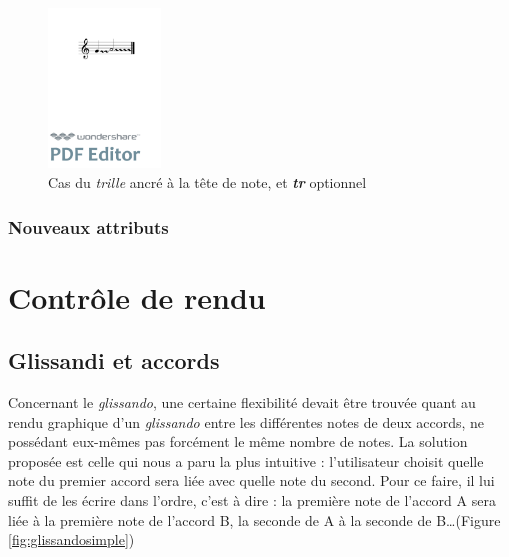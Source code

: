 \documentclass{article}
\newenvironment{gmncode}	{\vspace{-2mm}\small\verbatim}{\endverbatim\vspace{-2mm}}
\begin{document}
\begin{figure}[h]
\centering
\begin{gmncode}
[ \trill<tr="false", anchor="note">
( {g} {a/2} ) ]
\end{gmncode}
\includegraphics[width=30mm]{img/trillanchor.pdf}
\caption{Cas du \emph{trille} ancré à la tête de note, et \textit{\textbf{tr}} optionnel}
\label{fig:trillanchor}
\end{figure}

\subsubsection{Nouveaux attributs}\label{subsubsec:attributs}



\section{Contr\^ole de rendu}\label{sec:controleRendu}

\subsection{Glissandi et accords}\label{subsec:glissandiAccords}

Concernant le \emph{glissando}, une certaine flexibilité devait être trouvée quant au rendu graphique d'un \emph{glissando} entre les différentes notes de deux accords, ne possédant eux-mêmes pas forcément le même nombre de notes. La solution proposée est celle qui nous a paru la plus intuitive : l'utilisateur choisit quelle note du premier accord sera liée avec quelle note du second. Pour ce faire, il lui suffit de les écrire dans l'ordre, c'est à dire : la première note de l'accord A sera liée à la première note de l'accord B, la seconde de A à la seconde de B\dots{}(Figure \ref{fig:glissandosimple})
\end{document}
